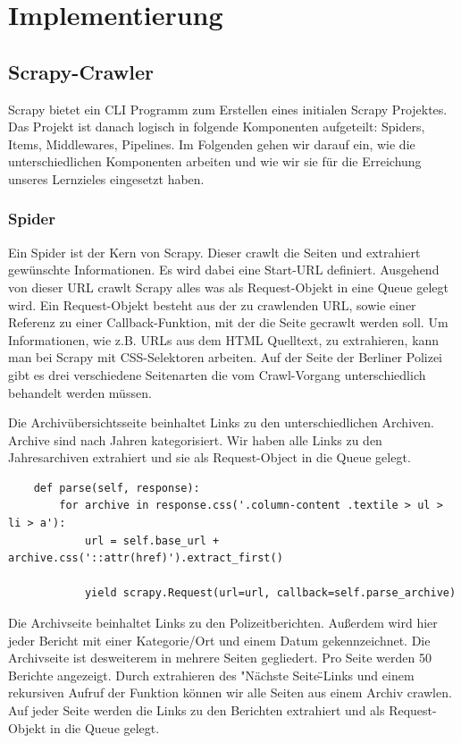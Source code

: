\documentclass[chapterprefix=false, 12pt, a4paper, oneside, parskip=half, listof=totoc, bibliography=totoc, numbers=noendperiod]{scrbook}
\begin{document}
	\chapter{Implementierung}

    \section{Scrapy-Crawler}

    Scrapy bietet ein CLI Programm zum Erstellen eines initialen Scrapy Projektes.
    Das Projekt ist danach logisch in folgende Komponenten aufgeteilt: Spiders, Items, Middlewares, Pipelines.
    Im Folgenden gehen wir darauf ein, wie die unterschiedlichen Komponenten arbeiten und wie wir sie für die
    Erreichung unseres Lernzieles eingesetzt haben.

    \subsection{Spider}

    Ein Spider ist der Kern von Scrapy. Dieser crawlt die Seiten und extrahiert gewünschte Informationen.
    Es wird dabei eine Start-URL definiert. Ausgehend von dieser URL crawlt Scrapy alles was als Request-Objekt in
    eine Queue gelegt wird. Ein Request-Objekt besteht aus der zu crawlenden URL, sowie einer Referenz zu einer Callback-Funktion,
    mit der die Seite gecrawlt werden soll. Um Informationen, wie z.B. URLs aus dem HTML Quelltext, zu extrahieren, kann man bei Scrapy
    mit CSS-Selektoren arbeiten. Auf der Seite der Berliner Polizei gibt es drei verschiedene Seitenarten die vom Crawl-Vorgang
    unterschiedlich behandelt werden müssen.

    Die Archivübersichtsseite beinhaltet Links zu den unterschiedlichen Archiven. Archive sind nach Jahren kategorisiert.
    Wir haben alle Links zu den Jahresarchiven extrahiert und sie als Request-Object in die Queue gelegt.

    \begin{verbatim}
    def parse(self, response):
        for archive in response.css('.column-content .textile > ul > li > a'):
            url = self.base_url + archive.css('::attr(href)').extract_first()

            yield scrapy.Request(url=url, callback=self.parse_archive)
    \end{verbatim}

    Die Archivseite beinhaltet Links zu den Polizeitberichten. Außerdem wird hier jeder Bericht mit einer Kategorie/Ort
    und einem Datum gekennzeichnet. Die Archivseite ist desweiterem in mehrere Seiten gegliedert. Pro Seite werden 50 Berichte angezeigt.
    Durch extrahieren des "Nächste Seite\" -Links und einem rekursiven Aufruf der Funktion können wir alle Seiten aus einem
    Archiv crawlen. Auf jeder Seite werden die Links zu den Berichten extrahiert und als Request-Objekt in die Queue gelegt.
\end{document}
